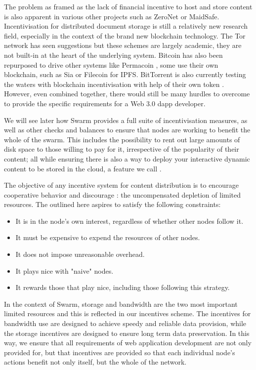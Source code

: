 The problem as framed as the lack of financial incentive to host and store content is also apparent in various other projects such as ZeroNet or MaidSafe. Incentivisation for distributed document storage is still a relatively new research field, especially in the context of the brand new blockchain technology. The Tor network has seen suggestions \cite{jansen2014onions,ghoshetal2014tor} but these schemes are largely academic, they are not built-in at the heart of the underlying system. Bitcoin has also been repurposed to drive other systems like Permacoin \cite{miller2014permacoin}, some use their own blockchain, such as Sia \cite{vorick2014sia} or Filecoin \cite{filecoin2014} for IPFS. BitTorrent is also currently testing the waters with blockchain incentivisation with help of their own token \cite{tron2018,bittorrent2019}. However, even combined together, there would still be many hurdles to overcome to provide the specific requirements for a Web 3.0 dapp developer.

We will see later how Swarm provides a full suite of incentivisation measures, as well as other checks and balances to ensure that nodes are working to benefit the whole of the swarm. This includes the possibility to rent out large amounts of disk space to those willing to pay for it, irrespective of the popularity of their content; all while ensuring there is also a way to deploy your interactive dynamic content to be stored in the cloud, a feature we call .

The objective of any incentive system for  content distribution is to encourage cooperative behavior and discourage : the uncompensated depletion of limited resources. The  outlined here aspires to satisfy the following constraints:

\begin{itemize}
    \item It is in the node's own interest, regardless of whether other nodes follow it.
    \item It must be expensive to expend the resources of other nodes.
    \item It does not impose unreasonable overhead.
    \item It plays nice with "naive" nodes.
    \item It rewards those that play nice, including those following this strategy.
\end{itemize}

In the context of Swarm, storage and bandwidth are the two most important limited resources and this is reflected in our incentives scheme. The incentives for bandwidth use are designed to achieve speedy and reliable data provision, while the storage incentives are designed to ensure long term data preservation. In this way, we ensure that all requirements of web application development are not only provided for, but that incentives are provided so that each individual node's actions benefit not only itself, but the whole of the network. 

